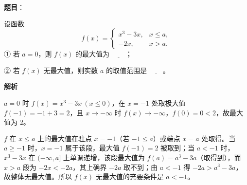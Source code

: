 \begin{answer}

\textbf{题目}：

设函数
\nopagebreak[4]
\[
f(x)=\begin{cases}
x^{3}-3x, & x\leqslant a,\\
-2x, & x>a.
\end{cases}
\]
① 若 \(a=0\)，则 \(f(x)\) 的最大值为 \(\underline{\qquad}\)；

② 若 \(f(x)\) 无最大值，则实数 \(a\) 的取值范围是 \(\underline{\qquad}\)。

\textbf{解析}


\(a=0\) 时 \(f(x)=x^3-3x\ (x\leqslant0)\)，在 \(x=-1\) 处取极大值 \(f(-1)=-1+3=2\)，且 \(x\to-\infty\) 时 \(f(x)\to-\infty\)，\(f(0)=0<2\)，故最大值为 \(2\)。


\(f\) 在 \(x\leqslant a\) 上的最大值在驻点 \(x=-1\)（若 \(-1\leqslant a\)）或端点 \(x=a\) 处取得。当 \(a\geqslant-1\) 时，\(x=-1\) 属于该段，最大值 \(f(-1)=2\) 被取到；当 \(a<-1\) 时，\(x^3-3x\) 在 \((-\infty,a]\) 上单调递增，该段最大值为 \(f(a)=a^3-3a\)（取得到），而 \(x>a\) 段为 \(-2x<-2a\)，其上确界 \(-2a\) 取不到；由 \(a<-1\) 得 \(-2a>a^3-3a\)，故整体无最大值。所以 \(f(x)\) 无最大值的充要条件是 \(a<-1\)。


\end{answer}
